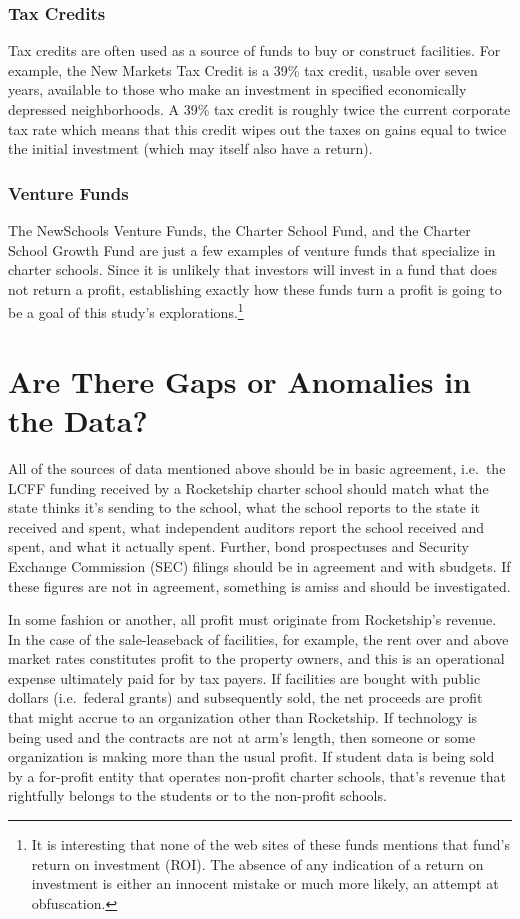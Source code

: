 \subsubsection{Tax Credits}\label{sec:tax-credits}\indent

Tax credits are often used as a source of funds to buy or construct facilities. For example, the New Markets Tax Credit is a 39\% tax credit, usable over seven years, available to those who make an investment in specified economically depressed neighborhoods. A 39\% tax credit is roughly twice the current corporate tax rate which means that this credit wipes out the taxes on gains equal to twice the initial investment (which may itself also have a return). 

\subsubsection{Venture Funds}\label{sec:venture-funds}\indent

The NewSchools Venture Funds, the Charter School Fund, and the Charter School Growth Fund are just a few examples of venture funds that specialize in charter schools. Since it is unlikely that investors will invest in a fund that does not return a profit, establishing exactly how these funds turn a profit is going to be a goal of this study's explorations.\footnote{It is interesting that none of the web sites of these funds mentions that fund's return on investment (ROI). The absence of any indication of a return on investment is either an innocent mistake or much more likely, an attempt at obfuscation.}

\section{Are There Gaps or Anomalies in the Data?}\label{sec:gaps-anomalies}\indent

All of the sources of data mentioned above should be in basic agreement, i.e.~the LCFF funding received by a Rocketship charter school should match what the state thinks it's sending to the school, what the school reports to the state it received and spent, what independent auditors report the school received and spent, and what it actually spent. Further, bond prospectuses and Security Exchange Commission (SEC) filings should be in agreement and with sbudgets. If these figures are not in agreement, something is amiss and should be investigated.

In some fashion or another, all profit must originate from Rocketship's revenue. In the case of the sale-leaseback of facilities, for example, the rent over and above market rates constitutes profit to the property owners, and this is an operational expense ultimately paid for by tax payers. If facilities are bought with public dollars (i.e.~federal grants) and subsequently sold, the net proceeds are profit that might accrue to an organization other than Rocketship. If technology is being used and the contracts are not at arm's length, then someone or some organization is making more than the usual profit. If student data is being sold by a for-profit entity that operates non-profit charter schools, that's revenue that rightfully belongs to the students or to the non-profit schools. 


